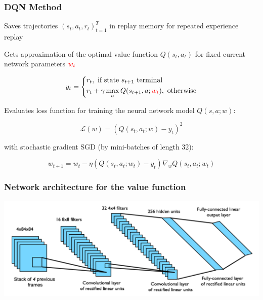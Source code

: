 \documentclass[fullscreen=true, bookmarks=true, hyperref={pdfencoding=unicode}]{beamer}
\begin{document}
\begin{frame}
  \frametitle{DQN Method}

  \pause
  Saves trajectories $(s_t, a_t, r_t)_{t=1}^T$ in replay memory for repeated experience replay

  \pause
  \vspace{0.2cm}
  Gets approximation of the optimal value function $Q(s_t, a_t)$ for fixed current network parameters ${\color{red} w_t}$

  $$y_t =
  \left\{ \begin{aligned}
  &r_t, \text{ if state } s_{t+1} \text{ terminal } \\
  &r_t + \gamma \max_a Q(s_{t+1}, a; {\color{red} w_t}), \text{ otherwise}
  \end{aligned}\right.
  $$

  \pause
  Evaluates loss function for training the neural network model $Q(s, a; w)$:

  $$ \mathscr{L} (w) = (Q(s_t, a_t; w) - y_t)^2 $$

  with stochastic gradient SGD (by mini-batches of length 32):

  $$ w_{t+1} = w_{t} - \eta \left(Q(s_t, a_t; w_t) - y_t\right) \nabla_w Q(s_t, a_t; w_t) $$
\end{frame}


\begin{frame}
  \frametitle{Network architecture for the value function}
  \begin{center}
    \includegraphics[keepaspectratio,
                     width=.85\paperwidth]{dql-cnn-arch.png}
  \end{center}
\end{frame}

\end{document}
